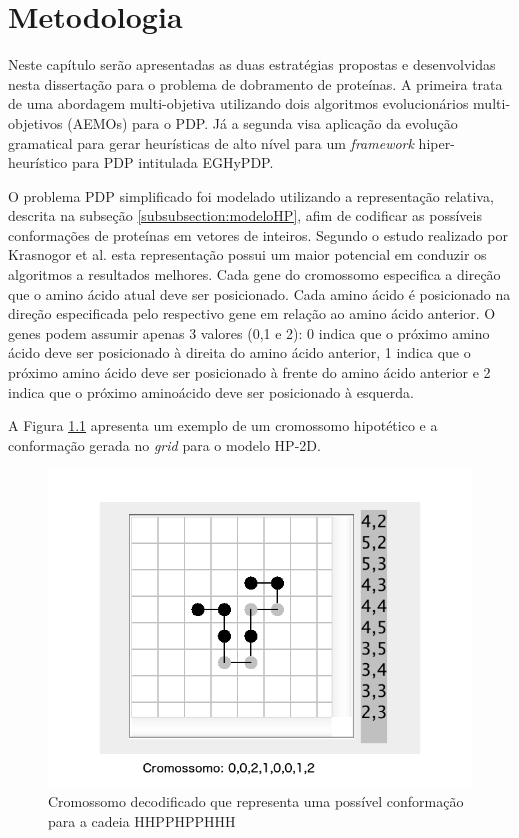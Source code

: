 \chapter{Metodologia}
\label{cap:Metodologia}

Neste capítulo serão apresentadas as duas estratégias propostas e desenvolvidas nesta dissertação para o problema de dobramento de proteínas. A primeira trata de uma abordagem multi-objetiva utilizando dois algoritmos evolucionários multi-objetivos (AEMOs) para o PDP. Já a segunda visa aplicação da evolução gramatical  para gerar heurísticas de alto nível para um \textit{framework} hiper-heurístico  para PDP intitulada EGHyPDP.


O problema PDP simplificado foi modelado utilizando a representação relativa, descrita na subseção \ref{subsubsection:modeloHP}, afim de codificar as possíveis conformações de proteínas em vetores de inteiros. Segundo o estudo realizado por Krasnogor et al. \cite{krasnogor1999protein} esta representação possui um maior potencial em conduzir os algoritmos a resultados melhores. Cada gene do cromossomo especifica a direção que o amino ácido atual deve ser posicionado. Cada amino ácido é posicionado na direção especificada pelo respectivo gene em relação ao amino ácido anterior. O genes podem assumir apenas 3 valores (0,1 e 2): 0 indica que o próximo amino ácido deve ser posicionado à direita do amino ácido anterior, 1 indica que o próximo amino ácido deve ser posicionado à frente do amino ácido anterior e 2 indica que o próximo aminoácido deve ser posicionado à esquerda. 

A Figura \ref{img:cromossomo} apresenta um exemplo de um cromossomo hipotético e a conformação gerada no \textit{grid} para o modelo HP-2D.


\begin{figure}[!htb]
	\centering
	\includegraphics[scale=0.36]{Imagens/DecodedCromossome.png}
	\caption{Cromossomo decodificado que representa uma possível conformação para a cadeia HHPPHPPHHH}
	\label{img:cromossomo}
\end{figure}




